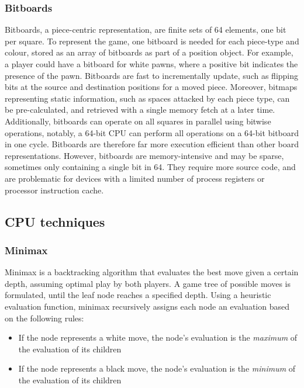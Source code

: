 \documentclass[../main/main.tex]{subfiles}
\begin{document}
\subsubsection*{Bitboards}
Bitboards, a piece-centric representation, are finite sets of 64 elements, one bit per square. To represent the game, one bitboard is needed for each piece-type and colour, stored as an array of bitboards as part of a position object. For example, a player could have a bitboard for white pawns, where a positive bit indicates the presence of the pawn. Bitboards are fast to incrementally update, such as flipping bits at the source and destination positions for a moved piece. Moreover, bitmaps representing static information, such as spaces attacked by each piece type, can be pre-calculated, and retrieved with a single memory fetch at a later time. Additionally, bitboards can operate on all squares in parallel using bitwise operations, notably, a 64-bit CPU can perform all operations on a 64-bit bitboard in one cycle. Bitboards are therefore far more execution efficient than other board representations. However, bitboards are memory-intensive and may be sparse, sometimes only containing a single bit in 64. They require more source code, and are problematic for devices with a limited number of process registers or processor instruction cache.

\subsection{CPU techniques}
\subsubsection*{Minimax}
Minimax is a backtracking algorithm that evaluates the best move given a certain depth, assuming optimal play by both players. A game tree of possible moves is formulated, until the leaf node reaches a specified depth. Using a heuristic evaluation function, minimax recursively assigns each node an evaluation based on the following rules:

\begin{itemize}
\item If the node represents a white move, the node’s evaluation is the \textit{maximum} of the evaluation of its children
\item If the node represents a black move, the node’s evaluation is the \textit{minimum} of the evaluation of its children
\end{itemize}
\end{document}
